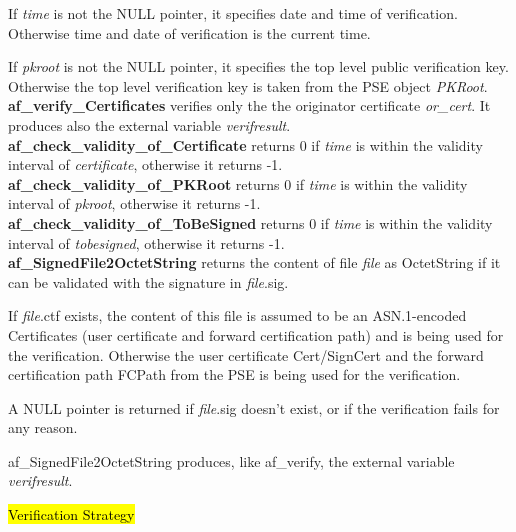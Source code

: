 If {\em time} is not the NULL pointer, it specifies date and time of verification. Otherwise
time and date of verification is the current time.

If {\em pkroot} is not the NULL pointer, it specifies the top level public verification key.
Otherwise the top level verification key is taken from the PSE object {\em PKRoot}. \\ [1em]
{\bf af\_verify\_Certificates} verifies only the the originator certificate {\em or\_cert}.
It produces also the external variable {\em verifresult}.
\\ [1em]
{\bf af\_check\_validity\_of\_Certificate} returns 0 if {\em time} is within the validity interval
of {\em certificate}, otherwise it returns -1.
\\ [1em]
{\bf af\_check\_validity\_of\_PKRoot} returns 0 if {\em time} is within the validity interval
of {\em pkroot}, otherwise it returns -1.
\\ [1em]
{\bf af\_check\_validity\_of\_ToBeSigned} returns 0 if {\em time} is within the validity interval
of {\em tobesigned}, otherwise it returns -1.
\\ [1em]
{\bf af\_SignedFile2OctetString} returns the content of file {\em file} as OctetString
if it can be validated with the signature in {\em file}.sig.
 
If {\em file}.ctf exists, the
content of this file is assumed to be an ASN.1-encoded Certificates (user certificate and
forward certification path) and is being used for the verification. Otherwise the
user certificate Cert/SignCert and the forward certification path FCPath from the PSE
is being used for the verification.

A NULL pointer is returned if {\em file}.sig doesn't exist, or if the verification
fails for any reason.
 
af\_SignedFile2OctetString produces, like af\_verify, the external variable {\em verifresult}. 

\hl{Verification Strategy}

